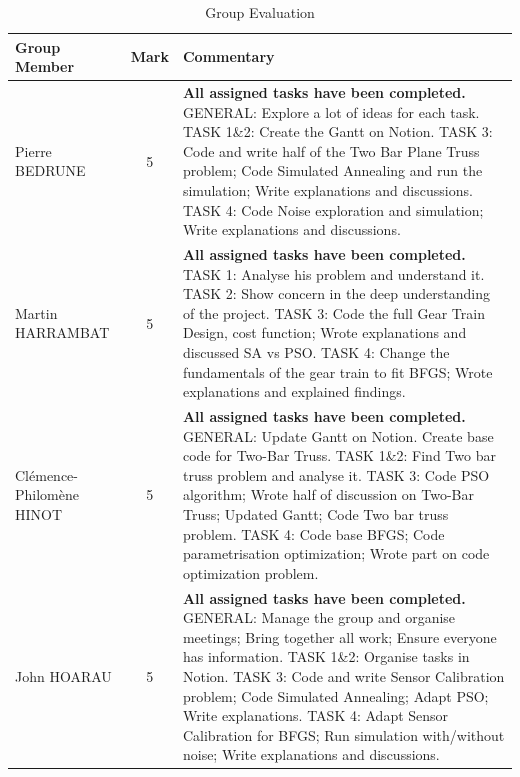 \begin{table}[H]
    \centering
    \footnotesize
    \begin{tabular}{|l|c|p{10cm}|}
    \hline
    Group Member & Mark & Commentary \\ \hline
    Pierre BEDRUNE & 5 & \textbf{All assigned tasks have been completed.} \newline GENERAL: Explore a lot of ideas for each task. \newline TASK 1\&2: Create the Gantt on Notion. \newline TASK 3: Code and write half of the Two Bar Plane Truss problem; Code Simulated Annealing and run the simulation; Write explanations and discussions. \newline TASK 4: Code Noise exploration and simulation; Write explanations and discussions. \\ \hline
    Martin HARRAMBAT & 5 & \textbf{All assigned tasks have been completed.} \newline TASK 1: Analyse his problem and understand it. \newline TASK 2: Show concern in the deep understanding of the project. \newline TASK 3: Code the full Gear Train Design, cost function; Wrote explanations and discussed SA vs PSO. \newline TASK 4: Change the fundamentals of the gear train to fit BFGS; Wrote explanations and explained findings. \\ \hline
    Clémence-Philomène HINOT & 5 & \textbf{All assigned tasks have been completed.} \newline GENERAL: Update Gantt on Notion. Create base code for Two-Bar Truss. \newline TASK 1\&2: Find Two bar truss problem and analyse it. \newline TASK 3: Code PSO algorithm; Wrote half of discussion on Two-Bar Truss; Updated Gantt; Code Two bar truss problem. \newline TASK 4: Code base BFGS; Code parametrisation optimization; Wrote part on code optimization problem. \\ \hline
    John HOARAU & 5 & \textbf{All assigned tasks have been completed.} \newline GENERAL: Manage the group and organise meetings; Bring together all work; Ensure everyone has information. \newline TASK 1\&2: Organise tasks in Notion. \newline TASK 3: Code and write Sensor Calibration problem; Code Simulated Annealing; Adapt PSO; Write explanations. \newline TASK 4: Adapt Sensor Calibration for BFGS; Run simulation with/without noise; Write explanations and discussions. \\ \hline
    \end{tabular}
    \caption{Group Evaluation}
    \label{tab:group_eval}
\end{table}

